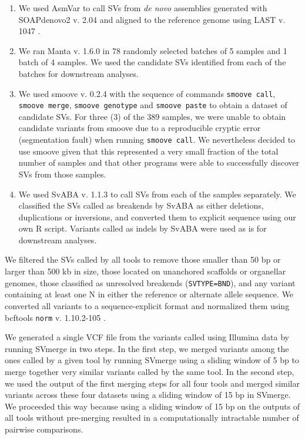 \begin{enumerate}

\item We used AsmVar \citep[version of 2015-04-16, ][]{liu2015} to call SVs
	from \emph{de novo} assemblies generated with SOAPdenovo2 v. 2.04
		\citep{luo2012} and aligned to the reference genome using LAST
		v. 1047 \citep{kielbasa2011}.
\item We ran Manta v. 1.6.0 \citep{chen2016} in 78 randomly selected batches of
	5 samples and 1 batch of 4 samples. We used the candidate SVs
		identified from each of the batches for downstream analyses.
\item We used smoove v. 0.2.4 \citep{pedersen2019} with the sequence of
	commands \texttt{smoove call}, \texttt{smoove merge}, \texttt{smoove
		genotype} and \texttt{smoove paste} to obtain a dataset of
		candidate SVs. For three (3) of the 389 samples, we were unable
		to obtain candidate variants from smoove due to a reproducible
		cryptic error (segmentation fault) when running \texttt{smoove
		call}. We nevertheless decided to use smoove given that this
		represented a very small fraction of the total number of
		samples and that other programs were able to successfully
		discover SVs from those samples.
\item We used SvABA v. 1.1.3 \citep{wala2018} to call SVs from each of the
	samples separately. We classified the SVs called as breakends by SvABA
		as either deletions, duplications or inversions, and converted
		them to explicit sequence using our own R script. Variants
		called as indels by SvABA were used as is for downstream
		analyses.
\end{enumerate}

We filtered the SVs called by all tools to remove those smaller than 50 bp or
larger than 500 kb in size, those located on unanchored scaffolds or organellar
genomes, those classified as unresolved breakends (\texttt{SVTYPE=BND}), and
any variant containing at least one N in either the reference or alternate
allele sequence.  We converted all variants to a sequence-explicit format and
normalized them using bcftools \texttt{norm} v. 1.10.2-105
\citep{li2009-samtools}.

We generated a single VCF file from the variants called using Illumina data by
running SVmerge \citep{wong2010} in two steps. In the first step, we merged
variants among the ones called by a given tool by running SVmerge using a
sliding window of 5 bp to merge together very similar variants called by the
same tool. In the second step, we used the output of the first merging steps
for all four tools and merged similar variants across these four datasets using
a sliding window of 15 bp in SVmerge.  We proceeded this way because using a
sliding window of 15 bp on the outputs of all tools without pre-merging
resulted in a computationally intractable number of pairwise comparisons.

